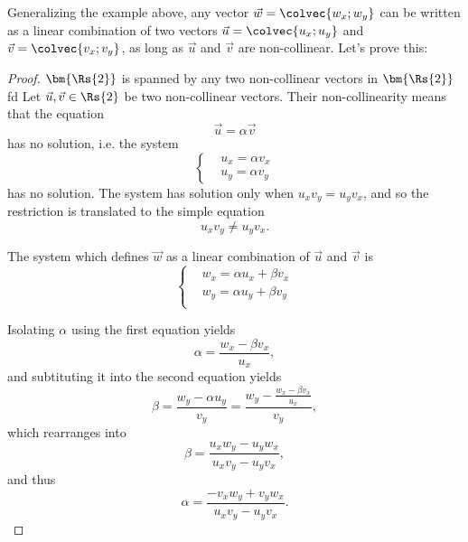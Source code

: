 Generalizing the example above, any vector $\vec{w}=\colvec{w_{x};w_{y}}$ can be written as a linear combination of two vectors $\vec{u}=\colvec{u_{x};u_{y}}$ and $\vec{v}=\colvec{v_{x};v_{y}}$, as long as $\vec{u}$ and $\vec{v}$ are non-collinear. Let's prove this:
\begin{proof}{$\bm{\Rs{2}}$ is spanned by any two non-collinear vectors in $\bm{\Rs{2}}$}{fd}
	Let $\vec{u},\vec{v}\in\Rs{2}$ be two non-collinear vectors. Their non-collinearity means that the equation
	\begin{equation}
		\vec{u} = \alpha\vec{v}
		\label{eq:collinear vectors}
	\end{equation}
	has no solution, i.e. the system
	\begin{equation}
		\begin{cases}
			&u_{x} = \alpha v_{x}\\
			&u_{y} = \alpha v_{y}
		\end{cases}
		\label{eq:collinear system}
	\end{equation}
	has no solution. The system has solution only when $u_{x}v_{y} = u_{y}v_{x}$, and so the restriction is translated to the simple equation
	\begin{equation}
		u_{x}v_{y} \neq u_{y}v_{x}.
		\label{eq:restriction}
	\end{equation}

	The system which defines $\vec{w}$ as a linear combination of $\vec{u}$ and $\vec{v}$ is
	\begin{equation}
		\begin{cases}
			&w_{x} = \alpha u_{x} + \beta v_{x}\\
			&w_{y} = \alpha u_{y} + \beta v_{y}\\
		\end{cases}
		\label{eq:linear combination of two vectors}
	\end{equation}

	Isolating $\alpha$ using the first equation yields
	\begin{equation}
		\alpha = \frac{w_{x}-\beta v_{x}}{u_{x}},
		\label{eq:isolation1}
	\end{equation}
	and subtituting it into the second equation yields
	\begin{equation}
		\beta = \frac{w_{y}-\alpha u_{y}}{v_{y}} = \frac{w_{y}-\frac{w_{x}-\beta v_{x}}{u_{x}}}{v_{y}},
		\label{eq:isolation2}
	\end{equation}
	which rearranges into
	\begin{equation}
		\beta = \frac{u_{x} w_{y} - u_{y} w_{x}}{u_{x} v_{y} - u_{y} v_{x}},
		\label{eq:test}
	\end{equation}
	and thus
	\begin{equation}
		\alpha = \frac{- v_{x} w_{y} + v_{y} w_{x}}{u_{x} v_{y} - u_{y} v_{x}}.
		\label{eq:test2}
	\end{equation}


\end{proof}
